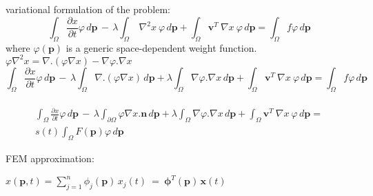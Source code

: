 \documentclass{beamer}
\newcommand{\mb}{\mathbf}
\begin{document}
\begin{frame}
variational formulation of the problem:\\
\[
	\int_\Omega \frac{\partial x}{\partial t} \varphi \, d\mb{p} \, - \,
	\lambda \int_\Omega ~\nabla^2 x~ \varphi \, d\mb{p} +
	\int_\Omega \mb{v}^T  ~\nabla x~ \varphi \, d\mb{p} =
	\int_\Omega f \varphi \, d\mb{p}
	\]
	where $\varphi(\mb{p})$ is a generic space-dependent weight function.
\\ 	
$\varphi \nabla^2 x = \nabla . (\varphi \nabla x) - \nabla \varphi . \nabla x$\\

\[
	\int_\Omega \frac{\partial x}{\partial t} \varphi \, d\mb{p} \, - \,
	\lambda \int_\Omega \nabla . (\varphi \nabla x) \, d\mb{p} + \lambda \int_\Omega \nabla \varphi . \nabla x \, d\mb{p} +
	\int_\Omega \mb{v}^T  ~\nabla x~ \varphi \, d\mb{p} =
	\int_\Omega f \varphi \, d\mb{p}
	\]\\
	
	\[
	\begin{array}{l}
	\displaystyle
	\int_\Omega \frac{\partial x}{\partial t} \varphi \, d\mb{p} \, - \,
	\lambda \int_{\partial \Omega} \varphi \nabla x . \mb{n} \, d\mb{p} + \lambda \int_\Omega \nabla \varphi . \nabla x \, d\mb{p} +
	\int_\Omega \mb{v}^T  ~\nabla x~ \varphi \, d\mb{p} = \\ [4mm]
	\displaystyle
	s(t) \int_\Omega F(\mb{p}) \varphi \, d\mb{p}
	
	\end{array}
	\]
	
	
\vspace{0.1cm}
FEM approximation:\\
\begin{center}

$	x(\mb{p},t) = \sum_{j=1}^{n} \phi_{j}(\mb{p}) \, x_j(t) ~=~ \boldsymbol{\phi}^T(\mb{p}) \, \mb{x}(t)$

\end{center}
\vspace{0.1cm}

\end{frame}
\end{document}
